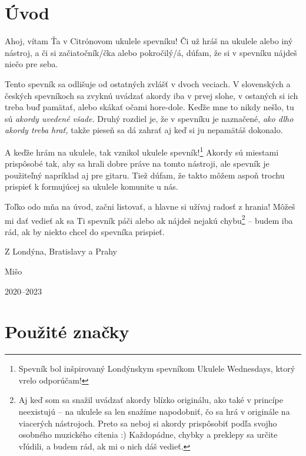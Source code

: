 \begingroup %
\setlength{\parindent}{0pt}
\setlength{\parskip}{\baselineskip}
\def\arraystretch{1.7}%
\setlength{\arrayrulewidth}{0.3mm}
\large

\section*{Úvod}

Ahoj, vítam Ťa v Citrónovom ukulele spevníku! Či už hráš na ukulele alebo iný nástroj,
a či si začiatočník/čka alebo pokročilý/á, dúfam, že si v spevníku nájdeš niečo pre seba.

Tento spevník sa odlišuje od ostatných zvlášť v dvoch veciach. V slovenských a českých
spevníkoch sa zvyknú uvádzať akordy iba v prvej slohe, v ostaných si ich treba buď
pamätať, alebo skákať očami hore-dole. Keďže mne to nikdy nešlo, tu sú
\emph{akordy uvedené všade.} Druhý rozdiel je, že v spevníku je naznačené,
\emph{ako dlho akordy treba hrať,} takže pieseň sa dá zahrať aj keď si ju
nepamätáš dokonalo.

A keďže hrám na ukulele, tak vznikol ukulele spevník!\footnote{Spevník bol inšpirovaný
Londýnskym spevníkom Ukulele Wednesdays, ktorý vrelo odporúčam!} Akordy sú miestami
prispôsobé tak, aby sa hrali dobre práve na tomto nástroji, ale spevník je použiteľný
napríklad aj pre gitaru. Tiež dúfam, že takto môžem aspoň trochu prispieť k formujúcej
sa ukulele komunite u nás.

Toľko odo mňa na úvod, začni listovať, a hlavne si užívaj radosť z hrania! Môžeš
mi dať vedieť ak sa Ti spevník páči alebo ak nájdeš nejakú chybu\footnote{
Aj keď som sa snažil uvádzať akordy blízko originálu,  ako také
v princípe neexistujú -- na ukulele sa len snažíme napodobniť, čo sa hrá v originále
na viacerých nástrojoch. Preto sa neboj si akordy prispôsobiť podľa svojho osobného
muzického cítenia :) Každopádne, chybky a preklepy sa určite vľúdili, a budem rád,
ak mi o nich dáš vedieť.
}
-- budem iba rád,
ak by niekto chcel do spevníka prispieť.

Z Londýna, Bratislavy a Prahy

{
\hspace{1cm}
Mišo

\vspace{-0.3cm}
\hspace{1cm}
2020--2023
}

\newpage
\section*{Použité značky}

